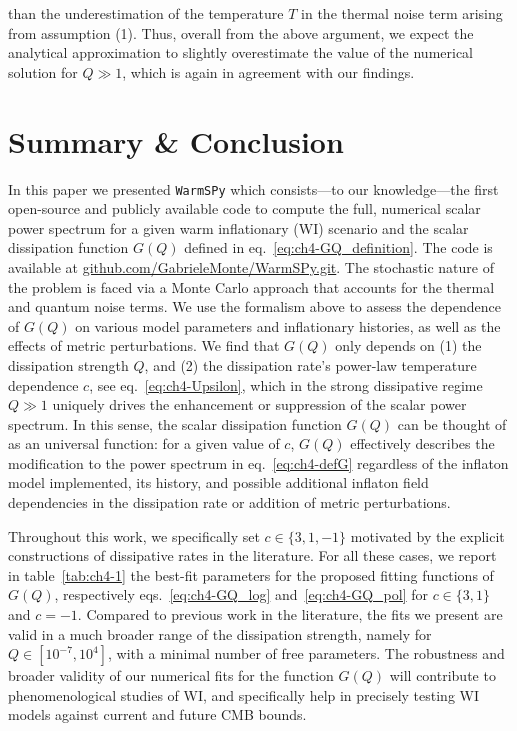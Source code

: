than the underestimation  of the temperature $T$ in the thermal noise term arising from assumption (1). Thus, overall from the above argument, we expect the analytical approximation to slightly overestimate the value of the numerical solution for $Q\gg1$, which is again in agreement with our findings.


\section{Summary \& Conclusion}

In this paper we presented \texttt{WarmSPy} which consists—to our knowledge—the first open-source and publicly available code to compute the full, numerical scalar power spectrum for a given warm inflationary (WI) scenario and the scalar dissipation function $G(Q)$ defined in eq.~\eqref{eq:ch4-GQ_definition}.
The code is available at \href{https://github.com/GabrieleMonte/WarmSPy.git}{github.com/GabrieleMonte/WarmSPy.git}. The stochastic nature of the problem is faced via a Monte Carlo approach that accounts for the thermal and quantum noise terms. We use the formalism above to assess the dependence of $G(Q)$ on various model parameters and inflationary histories, as well as the effects of metric perturbations. We find that $G(Q)$ only depends on (1) the dissipation strength $Q$, and (2) the dissipation rate's power-law temperature dependence $c$, see eq.~\eqref{eq:ch4-Upsilon}, which in the strong dissipative regime $Q\gg 1$ uniquely drives the enhancement or suppression of the scalar power spectrum. In this sense, the scalar dissipation function $G(Q)$ can be thought of as an universal function: for a given value of $c$, $G(Q)$ effectively describes the modification to the power spectrum in eq.~\eqref{eq:ch4-defG} regardless of the inflaton model implemented, its history, and possible additional inflaton field dependencies in the dissipation rate or addition of metric perturbations.

Throughout this work, we specifically set $c\in\{3,1,-1\}$ motivated by the explicit constructions of dissipative rates in the literature. For all these cases, we report in table~\ref{tab:ch4-1} the best-fit parameters for the proposed fitting functions of $G(Q)$, respectively eqs.~\eqref{eq:ch4-GQ_log} and~\eqref{eq:ch4-GQ_pol} for $c\in\{3,1\}$ and $c=-1$. Compared to previous work in the literature, the fits we present are valid in a much broader range of the dissipation strength, namely for $Q\in[10^{-7},10^{4}]$, with a minimal number of free parameters. The robustness and broader validity of our numerical fits for the function $G(Q)$ will contribute to phenomenological studies of WI, and specifically help in precisely testing WI models against current and future CMB bounds.

